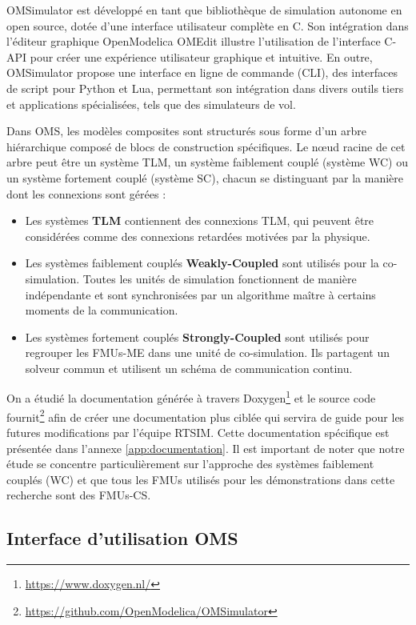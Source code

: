 OMSimulator \cite{b14} est développé en tant que bibliothèque de simulation autonome en open source, dotée d'une interface utilisateur complète en C. Son intégration dans l'éditeur graphique OpenModelica OMEdit illustre l'utilisation de l'interface C-API pour créer une expérience utilisateur graphique et intuitive. En outre, OMSimulator propose une interface en ligne de commande (CLI), des interfaces de script pour Python et Lua, permettant son intégration dans divers outils tiers et applications spécialisées, tels que des simulateurs de vol.

Dans OMS, les modèles composites sont structurés sous forme d'un arbre hiérarchique composé de blocs de construction spécifiques. Le nœud racine de cet arbre peut être un système TLM, un système faiblement couplé (système WC) ou un système fortement couplé (système SC), chacun se distinguant par la manière dont les connexions sont gérées : 
\begin{itemize}
    \item Les systèmes \textbf{TLM} contiennent des connexions TLM, qui peuvent être considérées comme des connexions retardées motivées par la physique.
    \item Les systèmes faiblement couplés \textbf{Weakly-Coupled} sont utilisés pour la co-simulation. Toutes les unités de simulation fonctionnent de manière indépendante et sont synchronisées par un algorithme maître à certains moments de la communication.
    \item Les systèmes fortement couplés \textbf{Strongly-Coupled} sont utilisés pour regrouper les FMUs-ME dans une unité de co-simulation. Ils partagent un solveur commun et utilisent un schéma de communication continu. 
\end{itemize}
On a étudié la documentation générée à travers Doxygen\footnote{\url{https://www.doxygen.nl/}} et le source code fournit\footnote{\url{https://github.com/OpenModelica/OMSimulator}} afin de créer une documentation plus ciblée qui servira de guide pour les futures modifications par l'équipe RTSIM. Cette documentation spécifique est présentée dans l'annexe \ref{app:documentation}.  Il est important de noter que notre étude se concentre particulièrement sur l'approche des systèmes faiblement couplés (WC) et que tous les FMUs utilisés pour les démonstrations dans cette recherche sont des FMUs-CS.

\subsection{Interface d'utilisation OMS}

